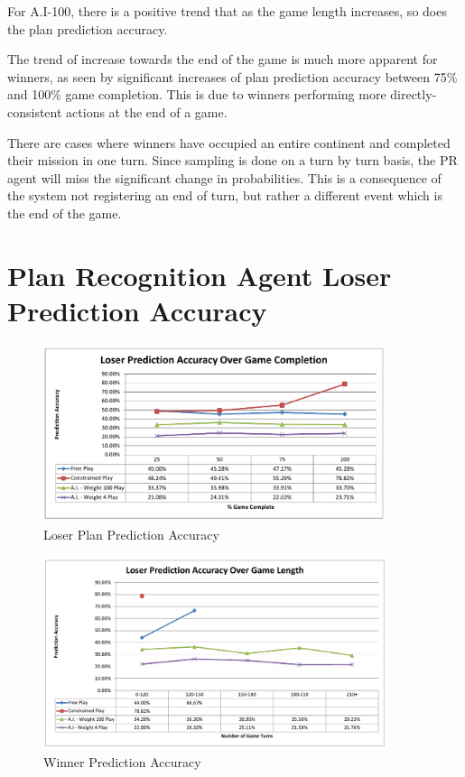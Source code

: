 \documentclass[parskip]{cs4rep}
\begin{document}
For A.I-100,  there is a positive trend that as the game length increases, so does the plan prediction accuracy.

The trend of increase towards the end of the game is much more apparent for winners, as seen by significant increases of plan prediction accuracy between 75\% and 100\% game completion. This is due to winners performing more directly-consistent actions at the end of a game.

There are cases where winners have occupied an entire continent and completed their mission in one turn. Since sampling is done on a turn by turn basis, the PR agent will miss the significant change in probabilities. This is a consequence of the system not registering an end of turn, but rather a different event which is the end of the game.

\newpage

\section{Plan Recognition Agent Loser Prediction Accuracy}
\begin{figure}[h]
\centerline{
\includegraphics[width=0.9\textwidth]{images/loser-game-complete.pdf}
}
\caption{Loser Plan Prediction Accuracy}
\label{fig:dom-debug-gui}
\end{figure}

\begin{figure}[h]
\centerline{
\includegraphics[width=0.9\textwidth]{images/loser-game-length.pdf}
}
\caption{Winner Prediction Accuracy}
\label{fig:dom-debug-gui}
\end{figure}
\end{document}
